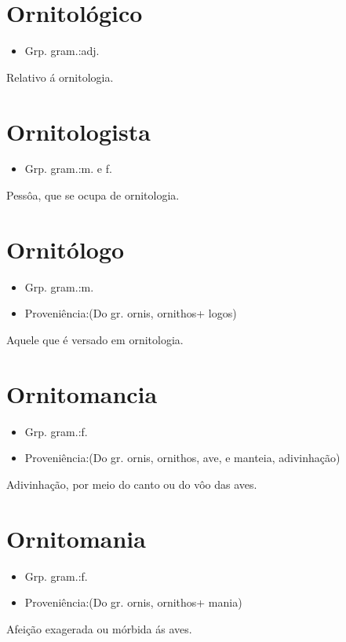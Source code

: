 \section{Ornitológico}
\begin{itemize}
\item {Grp. gram.:adj.}
\end{itemize}
Relativo á ornitologia.
\section{Ornitologista}
\begin{itemize}
\item {Grp. gram.:m.  e  f.}
\end{itemize}
Pessôa, que se ocupa de ornitologia.
\section{Ornitólogo}
\begin{itemize}
\item {Grp. gram.:m.}
\end{itemize}
\begin{itemize}
\item {Proveniência:(Do gr. \textunderscore ornis\textunderscore , \textunderscore ornithos\textunderscore  + \textunderscore logos\textunderscore )}
\end{itemize}
Aquele que é versado em ornitologia.
\section{Ornitomancia}
\begin{itemize}
\item {Grp. gram.:f.}
\end{itemize}
\begin{itemize}
\item {Proveniência:(Do gr. \textunderscore ornis\textunderscore , \textunderscore ornithos\textunderscore , ave, e \textunderscore manteia\textunderscore , adivinhação)}
\end{itemize}
Adivinhação, por meio do canto ou do vôo das aves.
\section{Ornitomania}
\begin{itemize}
\item {Grp. gram.:f.}
\end{itemize}
\begin{itemize}
\item {Proveniência:(Do gr. \textunderscore ornis\textunderscore , \textunderscore ornithos\textunderscore  + \textunderscore mania\textunderscore )}
\end{itemize}
Afeição exagerada ou mórbida ás aves.
